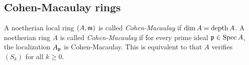         


\subsection{Cohen-Macaulay rings}

    \begin{definition}\label{def: Cohen-Macaulay}
        A noetherian local ring $(A,{\mathfrak{m}})$ is called \textit{Cohen-Macaulay} if $\dim A = \operatorname{depth} A$.
        A noetherian ring $A$ is called \textit{Cohen-Macaulay} if for every prime ideal ${\mathfrak{p}} \in \operatorname{Spec} A$, the localization $A_{\mathfrak{p}}$ is Cohen-Macaulay.
        This is equivalent to that \(A\) verifies $(S_k)$ for all \(k \geq 0\).
    \end{definition}

    \begin{example}
    \end{example}

